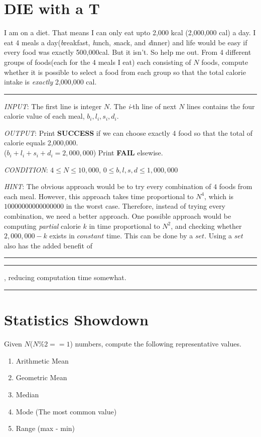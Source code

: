 \documentclass{article}
\begin{document}
\pagestyle{fancy}
\setcounter{section}{-1}

\section{DIE with a T}

I am on a diet. That means I can only eat upto 2,000 kcal (2,000,000 cal) a day.
I eat 4 meals a day(\textit{b}reakfast, \textit{l}unch, \textit{s}nack, and
\textit{d}inner) and life would be easy if
every food was exactly 500,000cal. But it isn't. So help me out.
From 4 different groups of foods(each for the 4 meals I eat) each consisting of $N$
foods, compute whether it is possible to select a food from each group
so that the total calorie intake is \textit{exactly} 2,000,000 cal.\\
\noindent\rule{\textwidth}{0.5pt}
\textit{INPUT}: The first line is integer $N$.
The \textit{i}-th line of next $N$ lines contains the four calorie value of each
meal, $b_{i}, l_{i}, s_{i}, d_{i}$.

\textit{OUTPUT}: Print \textbf{SUCCESS} if we can choose exactly 4 food so that
the total of calorie equals 2,000,000.\\($b_{i}+l_{i}+s_{i}+d_{i} = 2,000,000$)
Print \textbf{FAIL} elsewise.

\textit{CONDITION}: $ 4 \le N \le 10,000$, $ 0 \le b,l,s,d \le 1,000,000$

\textit{HINT}: The obvious approach would be to try every combination
of $4$ foods from each meal. However, this approach takes time proportional to $N^4$,
which is $10000000000000000$ in the worst case.
Therefore, instead of trying every combination, we need a better approach.
One possible approach would be computing \textit{partial} calorie $k$ in time
proportional to $N^2$, and checking whether $2,000,000-k$ exists in $constant$ time. This can be done by a $set$. Using a $set$ also has the added benefit of
\rule{0.5cm}{0.15mm} \rule{0.7cm}{0.15mm}, reducing computation time somewhat.\\
\noindent\rule{\textwidth}{0.5pt}

\section{Statistics Showdown}
Given $N$($N \% 2 == 1$) numbers, compute the following representative values.
\begin{enumerate}
  \item Arithmetic Mean
  \item Geometric Mean
  \item Median
  \item Mode (The most common value)
  \item Range (max - min)
\end{enumerate}
\end{document}
